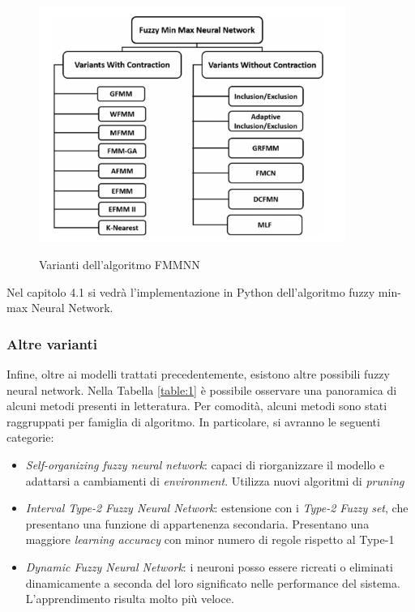 \documentclass[11pt]{article}
\begin{document}
\begin{figure}[h!]
\begin{center}
  \includegraphics[width=10cm]{Immagini/varianti_FMMNN.png}\\
  \caption{Varianti dell'algoritmo FMMNN}
\end{center}
\end{figure}

Nel capitolo 4.1 si vedrà l'implementazione in Python dell'algoritmo fuzzy min-max Neural Network.

\subsubsection{Altre varianti}

Infine, oltre ai modelli trattati precedentemente, esistono altre possibili fuzzy neural network. Nella Tabella \ref{table:1} è possibile osservare una panoramica di alcuni metodi presenti in letteratura. Per comodità, alcuni metodi sono stati raggruppati per famiglia di algoritmo. 
In particolare, si avranno le seguenti categorie: 

\begin{itemize}
\item \textit{Self-organizing fuzzy neural network}:  capaci di riorganizzare il modello e adattarsi a cambiamenti di \textit{environment}. Utilizza nuovi algoritmi di \textit{pruning}
\item \textit{Interval Type-2 Fuzzy Neural Network}: estensione con i \textit{Type-2 Fuzzy set}, che presentano una funzione di appartenenza secondaria. Presentano una maggiore \textit{learning accuracy} con minor numero di regole rispetto al Type-1 
\item \textit{Dynamic Fuzzy Neural Network}: i neuroni posso essere ricreati o eliminati dinamicamente a seconda del loro significato nelle performance del sistema. L'apprendimento risulta molto più veloce. 
\end{itemize}
\end{document}

